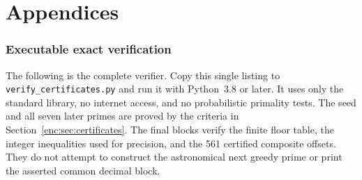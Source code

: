 \documentclass[11pt,a4paper]{article}
\theoremstyle{definition}
\theoremstyle{remark}
\numberwithin{equation}{section}
\begin{document}
\clearpage\appendix
\part*{Appendices}

\section{Executable exact verification}
\label{enc:app:verification-code}
The following is the complete verifier. Copy this single listing to
\texttt{verify\_certificates.py} and run it with Python~3.8 or later.
It uses only the standard library, no internet access, and no probabilistic
primality tests. The seed and all seven later primes are proved by the
criteria in Section~\ref{enc:sec:certificates}. The final blocks verify the
finite floor table, the integer inequalities used for precision, and the
561 certified composite offsets. They do not attempt to construct the
astronomical next greedy prime or print the asserted common decimal block.
\end{document}
